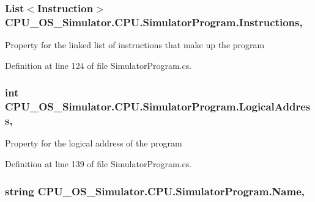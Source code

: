 \subsubsection[{Instructions}]{\setlength{\rightskip}{0pt plus 5cm}List$<${\bf Instruction}$>$ C\+P\+U\+\_\+\+O\+S\+\_\+\+Simulator.\+C\+P\+U.\+Simulator\+Program.\+Instructions\hspace{0.3cm}{\ttfamily [get]}, {\ttfamily [set]}}\label{class_c_p_u___o_s___simulator_1_1_c_p_u_1_1_simulator_program_ae64c462081a1806d5f194c271dbb2686}


Property for the linked list of instructions that make up the program 



Definition at line 124 of file Simulator\+Program.\+cs.

\hypertarget{class_c_p_u___o_s___simulator_1_1_c_p_u_1_1_simulator_program_afda25ae1ba65b33787dfc1f9af1c1d8a}{}
\subsubsection[{Logical\+Address}]{\setlength{\rightskip}{0pt plus 5cm}int C\+P\+U\+\_\+\+O\+S\+\_\+\+Simulator.\+C\+P\+U.\+Simulator\+Program.\+Logical\+Address\hspace{0.3cm}{\ttfamily [get]}, {\ttfamily [set]}}\label{class_c_p_u___o_s___simulator_1_1_c_p_u_1_1_simulator_program_afda25ae1ba65b33787dfc1f9af1c1d8a}


Property for the logical address of the program 



Definition at line 139 of file Simulator\+Program.\+cs.

\hypertarget{class_c_p_u___o_s___simulator_1_1_c_p_u_1_1_simulator_program_a29b077a3403773010be9efe912d11b92}{}
\subsubsection[{Name}]{\setlength{\rightskip}{0pt plus 5cm}string C\+P\+U\+\_\+\+O\+S\+\_\+\+Simulator.\+C\+P\+U.\+Simulator\+Program.\+Name\hspace{0.3cm}{\ttfamily [get]}, {\ttfamily [set]}}\label{class_c_p_u___o_s___simulator_1_1_c_p_u_1_1_simulator_program_a29b077a3403773010be9efe912d11b92}


